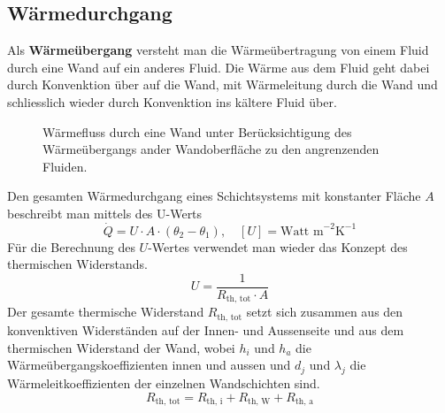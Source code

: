 \subsection{Wärmedurchgang}
Als \textbf{Wärmeübergang} versteht man die Wärmeübertragung von einem Fluid durch eine Wand auf ein anderes Fluid. Die Wärme aus dem Fluid geht dabei durch Konvenktion über auf die Wand, mit Wärmeleitung durch die Wand und schliesslich wieder durch Konvenktion ins kältere Fluid über.
\begin{figure}[H]
\centering
\caption{Wärmefluss durch eine Wand unter Berücksichtigung des Wärmeübergangs ander Wandoberfläche zu den angrenzenden Fluiden.}
\label{fig_Io}
\end{figure}
\noindent Den gesamten Wärmedurchgang eines Schichtsystems mit konstanter Fläche $A$ beschreibt man mittels des U-Werts
\begin{equation}
\boxed{\dot{Q}=U\cdot A\cdot\left(\theta_2-\theta_1\right),\quad [U]=\text{Watt m}^{-2}\text{K}^{-1}}
\end{equation}
Für die Berechnung des $U$-Wertes verwendet man wieder das Konzept des thermischen Widerstands.
\begin{equation}
\boxed{U=\dfrac{1}{R_{\text{th, tot}}\cdot A}}
\end{equation}
Der gesamte thermische Widerstand $R_{\text{th, tot}}$ setzt sich zusammen aus den konvenktiven Widerständen auf der Innen- und Aussenseite und aus dem thermischen Widerstand der Wand, wobei $h_i$ und $h_a$ die Wärmeübergangskoeffizienten innen und aussen und $d_j$ und $\lambda_j$ die Wärmeleitkoeffizienten der einzelnen Wandschichten sind.
\begin{equation}
\boxed{R_{\text{th, tot}}=R_{\text{th, i}}+R_{\text{th, W}}+R_{\text{th, a}}}
\end{equation}
